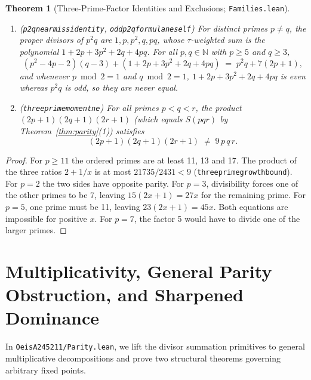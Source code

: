 \documentclass[11pt,reqno]{amsart}
\theoremstyle{plain}
\newtheorem{theorem}{Theorem}[section]
\theoremstyle{definition}
\theoremstyle{remark}
\newcommand{\leanid}[1]{\texttt{\upshape\def\_{\char95\relax}#1}}
\newcommand{\N}{\mathbb{N}}
\begin{document}
\begin{theorem}[Three-Prime-Factor Identities and Exclusions; \leanid{Families.lean}]
\label{thm:omega3}
\leavevmode
\begin{enumerate}
  \item (\leanid{p2q\_\allowbreak near\_\allowbreak miss\_\allowbreak identity}, \leanid{odd\_\allowbreak p2q\_\allowbreak formula\_\allowbreak ne\_\allowbreak self}) For distinct primes $p \ne q$, the proper divisors of $p^2 q$ are $1, p, p^2, q, p q$, whose $\tau$-weighted sum is the polynomial $1 + 2p + 3p^2 + 2q + 4pq$. For all $p, q \in \N$ with $p \ge 5$ and $q \ge 3$,
  \[
    (p^2 - 4p - 2)(q - 3) + (1 + 2p + 3p^2 + 2q + 4pq) \;=\; p^2 q + 7(2p + 1),
  \]
  and whenever $p \bmod 2 = 1$ and $q \bmod 2 = 1$, $1 + 2p + 3p^2 + 2q + 4pq$ is even whereas $p^2 q$ is odd, so they are never equal.
  \item (\leanid{three\_\allowbreak prime\_\allowbreak moment\_\allowbreak ne}) For all primes $p < q < r$, the product $(2p + 1)(2q + 1)(2r + 1)$ (which equals $S(p q r)$ by Theorem~\ref{thm:parity}(1)) satisfies
  \[
    (2p + 1)(2q + 1)(2r + 1) \;\ne\; 9\,p\,q\,r.
  \]
\end{enumerate}
\end{theorem}

\begin{proof}
For $p\ge11$ the ordered primes are at least 11, 13 and 17. The product of the three ratios $2+1/x$ is at most $21735/2431<9$ (\leanid{three\_\allowbreak prime\_\allowbreak growth\_\allowbreak bound}). For $p=2$ the two sides have opposite parity. For $p=3$, divisibility forces one of the other primes to be 7, leaving $15(2x+1)=27x$ for the remaining prime. For $p=5$, one prime must be 11, leaving $23(2x+1)=45x$. Both equations are impossible for positive $x$. For $p=7$, the factor 5 would have to divide one of the larger primes.
\end{proof}

\section{Multiplicativity, General Parity Obstruction, and Sharpened Dominance}

In \leanid{OeisA245211/Parity.lean}, we lift the divisor summation primitives to general multiplicative decompositions and prove two structural theorems governing arbitrary fixed points.
\end{document}

